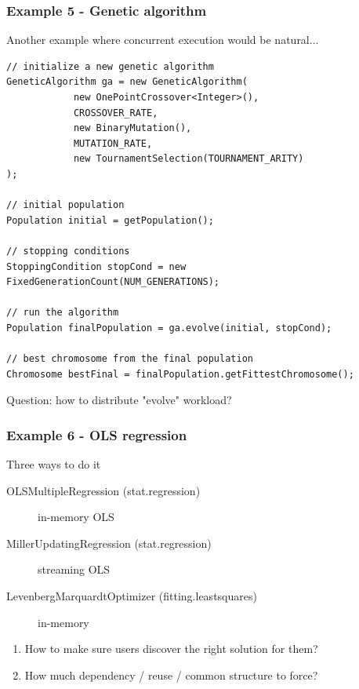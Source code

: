 \documentclass[14pt,mathserif]{beamer}
\begin{document}
\begin{frame}[fragile]
  \frametitle{Example 5 - Genetic algorithm}

\begin{small}
Another example where concurrent execution would be natural...
\end{small}
\begin{verbatim}
// initialize a new genetic algorithm
GeneticAlgorithm ga = new GeneticAlgorithm(
            new OnePointCrossover<Integer>(),
            CROSSOVER_RATE, 
            new BinaryMutation(),
            MUTATION_RATE,
            new TournamentSelection(TOURNAMENT_ARITY)
);

// initial population 
Population initial = getPopulation(); 

// stopping conditions
StoppingCondition stopCond = new FixedGenerationCount(NUM_GENERATIONS);

// run the algorithm
Population finalPopulation = ga.evolve(initial, stopCond);

// best chromosome from the final population
Chromosome bestFinal = finalPopulation.getFittestChromosome();

\end{verbatim}
 
\begin{small}
Question: how to distribute "evolve" workload?
\end{small}
\end{frame}

\begin{frame}[fragile]
  \frametitle{Example 6 - OLS regression}

\begin{small}
Three ways to do it
\begin{description}
  \item[OLSMultipleRegression (stat.regression)] in-memory OLS
  \item[MillerUpdatingRegression (stat.regression)] streaming OLS
  \item[LevenbergMarquardtOptimizer (fitting.leastsquares)] in-memory
\end{description}
\begin{enumerate}
\item How to make sure users discover the right solution for them?
\item How much dependency / reuse / common structure to force?
\end{enumerate}
\end{small}
\end{frame}
\end{document}
